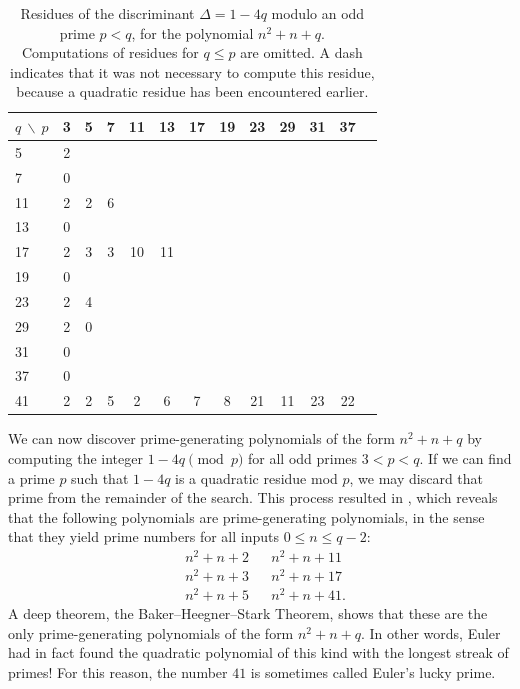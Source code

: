 \begin{table}
  \begin{center}
    \begin{tabular}{l|cccccccccccc}
      \toprule
      $q~\backslash~p$ & 3 & 5 & 7 & 11 & 13 & 17 & 19 & 23 & 29 & 31 & 37 \\ \midrule
      5  & 2 &&&&&&&&&& \\
      7  & 0 & \text{-} &&&&&&&&& \\
      11 & 2 & 2 & 6 &&&&&&&& \\
      13 & 0 & \text{-} & \text{-} & \text{-}  &&&&&&& \\
      17 & 2 & 3 & 3 & 10 & 11 &&&&&& \\
      19 & 0 & \text{-} & \text{-} & \text{-}  & \text{-}  & \text{-} &&&&& \\
      23 & 2 & 4 & \text{-} & \text{-}  & \text{-}  & \text{-} & \text{-} &&&& \\
      29 & 2 & 0 & \text{-} & \text{-}  & \text{-}  & \text{-} & \text{-} & \text{-} &&& \\
      31 & 0 & \text{-} & \text{-} & \text{-}  & \text{-}  & \text{-} & \text{-} & \text{-} & \text{-} && \\
      37 & 0 & \text{-} & \text{-} & \text{-}  & \text{-}  & \text{-} & \text{-} & \text{-} & \text{-} & \text{-} & \\
      41 & 2 & 2 & 5 & 2 & 6 & 7 & 8 & 21 & 11 & 23 & 22 \\ \bottomrule
    \end{tabular}
  \end{center}
  \caption[Residues of $1-4q$ modulo $p<q$]{Residues of the discriminant $\Delta=1-4q$ modulo an odd prime $p<q$, for the polynomial $n^2+n+q$.\\ Computations of residues for $q\leq p$ are omitted. A dash indicates that it was not necessary to compute this residue, because a quadratic residue has been encountered earlier.}
  \label{table:discriminants-prime-generating-polynomials}
\end{table}
We can now discover prime-generating polynomials of the form $n^2 + n + q$ by computing the integer $1-4q\pmod{p}$ for all odd primes $3<p<q$. If we can find a prime $p$ such that $1-4q$ is a quadratic residue mod $p$, we may discard that prime from the remainder of the search. This process resulted in , which reveals that the following polynomials are prime-generating polynomials, in the sense that they yield prime numbers for all inputs $0\leq n \leq q-2$:
\begin{align*}
  & n^2 + n + 2 & & n^2 + n + 11 \\
  & n^2 + n + 3 & & n^2 + n + 17 \\
  & n^2 + n + 5 & & n^2 + n + 41.
\end{align*}
A deep theorem, the Baker--Heegner--Stark Theorem, shows that these are the only prime-generating polynomials of the form $n^2 + n + q$. In other words, Euler had in fact found the quadratic polynomial of this kind with the longest streak of primes! For this reason, the number $41$ is sometimes called Euler's lucky prime.

